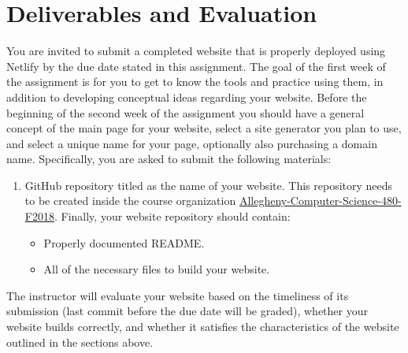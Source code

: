 \documentclass[11pt]{article}
\begin{document}
\section*{Deliverables and Evaluation}
You are invited to submit a completed website that is properly deployed using Netlify by the due date stated in this assignment. The goal of the first week of the assignment is for you to get to know the tools and practice using them, in addition to developing conceptual ideas regarding your website. Before the beginning of the second week of the assignment you should have a general concept of the main page for your website, select a site generator you plan to use, and select a unique name for your page, optionally also purchasing a domain name.
Specifically, you are asked to submit the following materials:
\begin{enumerate}
	\item GitHub repository titled as the name of your website. This repository needs to be created inside the course organization \href{https://github.com/orgs/Allegheny-Computer-Science-480-F2018}{Allegheny-Computer-Science-480-F2018}. Finally, your website repository should contain:
	\begin{itemize}
		\item Properly documented README.
		\item All of the necessary files to build your website. 
	\end{itemize}	 
\end{enumerate}

The instructor will evaluate your website based on the timeliness of its submission (last commit before the due date will be graded), whether your website builds correctly, and whether it satisfies the characteristics of the website outlined in the sections above.
\end{document}
